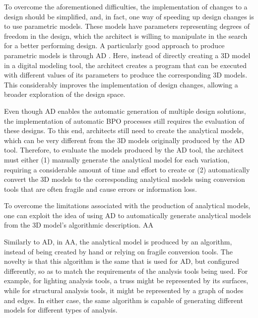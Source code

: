 	To overcome the aforementioned difficulties, the implementation of changes to a design should be simplified, and, in fact, one way of speeding up design changes is to use parametric models. These models have parameters representing degrees of freedom in the design, which the architect is willing to manipulate in the search for a better performing design. A particularly good approach to produce parametric models is through \ac{AD} \cite{Terzidis2006}. Here, instead of directly creating a 3D model in a digital modeling tool, the architect creates a program that can be executed with different values of its parameters to produce the corresponding 3D models. This considerably improves the implementation of design changes, allowing a broader exploration of the design space.
	
	Even though \ac{AD} enables the automatic generation of multiple design solutions, the implementation of automatic \ac{BPO} processes still requires the evaluation of these designs. To this end, architects still need to create  the analytical models, which can be very different from the 3D models originally produced by the \ac{AD} tool. Therefore, to evaluate the models produced by the \ac{AD} tool, the architect must either (1) manually generate the analytical model for each variation, requiring a considerable amount of time and effort to create or (2) automatically convert the 3D models to the corresponding analytical models using conversion tools that are often fragile and cause errors or information loss. 
	
	To overcome the limitations associated with the production of analytical models, one can exploit the idea of using \ac{AD} to automatically generate analytical models from the 3D model's algorithmic description. \ac{AA} 
	
	
	
	
	
	
	Similarly to \ac{AD}, in \ac{AA}, the analytical model is produced by an algorithm, instead of being created by hand or relying on fragile conversion tools. The novelty is that this algorithm is the same that is used for \ac{AD}, but configured differently, so as to match the requirements of the analysis tools being used. For example, for lighting analysis tools, a truss might be represented by its surfaces, while for structural analysis tools, it might be represented by a graph of nodes and edges. In either case, the same algorithm is capable of generating different models for different types of analysis.
	
